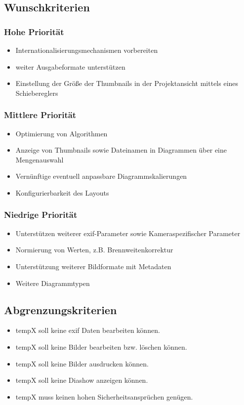 \subsection{Wunschkriterien} 

\subsubsection{Hohe Priorität}

	\begin{itemize}
		\item Internationalisierungsmechanismen vorbereiten
		\item weiter Ausgabeformate unterstützen 
		\item Einstellung der Größe der Thumbnails in der Projektansicht mittels eines Schiebereglers
	\end{itemize}

\subsubsection{Mittlere Priorität}

	\begin{itemize}
		\item Optimierung von Algorithmen
		\item Anzeige von Thumbnails sowie Dateinamen in Diagrammen über eine Mengenauswahl
		\item Vernünftige eventuell anpassbare Diagrammskalierungen
		\item Konfigurierbarkeit des Layouts	
	\end{itemize}

\subsubsection{Niedrige Priorität}

	\begin{itemize}
		\item Unterstützen weiterer \gls{exif}-Parameter sowie Kameraspezifischer Parameter
		\item Normierung von Werten, z.B. Brennweitenkorrektur
		\item Unterstützung weiterer Bildformate mit Metadaten 	
		\item Weitere Diagrammtypen
	\end{itemize}

\subsection{Abgrenzungskriterien} 
\begin{itemize}
	\item \gls{tempX} soll keine \gls{exif} Daten bearbeiten können.
	\item \gls{tempX} soll keine Bilder bearbeiten bzw. löschen können.
	\item \gls{tempX} soll keine Bilder ausdrucken können.
	\item \gls{tempX} soll keine Diashow anzeigen können.
	\item \gls{tempX} muss keinen hohen Sicherheitsansprüchen genügen.
\end{itemize}